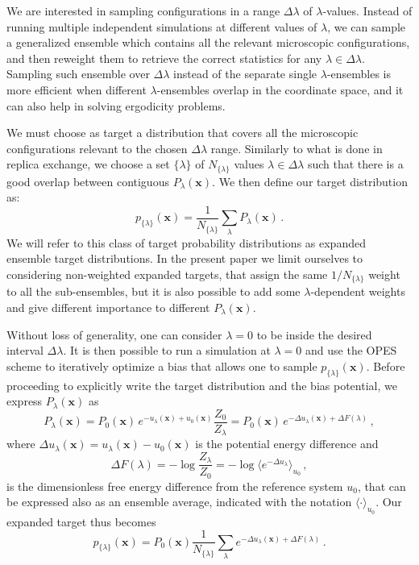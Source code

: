 \documentclass[aps,prx,reprint,superscriptaddress]{revtex4-1} %
\begin{document}
We are interested in sampling configurations in a range $\Delta \lambda$ of $\lambda$-values.
Instead of running multiple independent simulations at different values of $\lambda$, we can sample a generalized ensemble which contains all the relevant microscopic configurations, and then reweight them to retrieve the correct statistics for any $\lambda\in \Delta \lambda$.
Sampling such ensemble over $\Delta \lambda$ instead of the separate single $\lambda$-ensembles is more efficient when different $\lambda$-ensembles overlap in the coordinate space, and it can also help in solving ergodicity problems.

We must choose as target a distribution that covers all the microscopic configurations relevant to the chosen $\Delta \lambda$ range.
Similarly to what is done in replica exchange, we choose a set $\{\lambda\}$ of $N_{\{\lambda\}}$ values $\lambda \in \Delta \lambda$ such that there is a good overlap between contiguous $P_\lambda(\mathbf{x})$.
We then define our target distribution as:
\begin{equation}\label{E:target}
    p_{\{\lambda\}}(\mathbf{x})=\frac{1}{N_{\{\lambda\}}}\sum_\lambda P_\lambda(\mathbf{x})\, .
\end{equation}
We will refer to this class of target probability distributions as expanded ensemble target distributions.
In the present paper we limit ourselves to considering non-weighted expanded targets, that assign the same $1/N_{\{\lambda\}}$ weight to all the sub-ensembles, but it is also possible to add some $\lambda$-dependent weights and give different importance to different $P_\lambda(\mathbf{x})$.

Without loss of generality, one can consider $\lambda=0$ to be inside the desired interval $\Delta \lambda$.
It is then possible to run a simulation at $\lambda=0$ and use the OPES scheme to iteratively optimize a bias that allows one to sample $p_{\{\lambda\}}(\mathbf{x})$.
Before proceeding to explicitly write the target distribution and the bias potential, we express $P_\lambda(\mathbf{x})$ as
\begin{equation}
    P_\lambda(\mathbf{x})=P_0(\mathbf{x})\, e^{-u_\lambda(\mathbf{x})+u_0(\mathbf{x})}\frac{Z_0}{Z_\lambda}
    =P_0(\mathbf{x})\, e^{-\Delta u_\lambda(\mathbf{x})+\Delta F(\lambda)}\, ,
\end{equation}
where $\Delta u_\lambda(\mathbf{x})=u_\lambda(\mathbf{x})-u_0(\mathbf{x})$ is the potential energy difference and 
\begin{equation}\label{E:deltaF_def}
    \Delta F(\lambda)=-\log \frac{Z_\lambda}{Z_0}
    =-\log \langle e^{-\Delta u_\lambda}\rangle_{u_0}\, ,
\end{equation}
is the dimensionless free energy difference from the reference system $u_0$, that can be expressed also as an ensemble average, indicated with the notation $\langle \cdot \rangle_{u_0}$.
Our expanded target thus becomes
\begin{equation}\label{E:expanded_target}
    p_{\{\lambda\}}(\mathbf{x})=P_0(\mathbf{x})\frac{1}{N_{\{\lambda\}}} \sum_\lambda 
    e^{-\Delta u_\lambda(\mathbf{x})+\Delta F(\lambda)}\, .
\end{equation}
\end{document}
